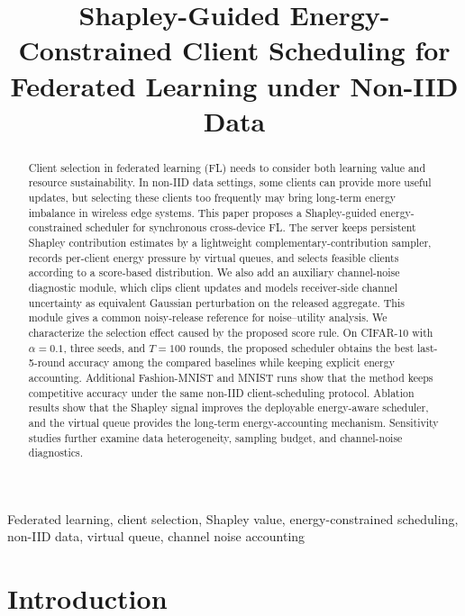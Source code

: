 \documentclass[journal]{IEEEtran}
\newcommand{\PaperTitle}{Shapley-Guided Energy-Constrained Client Scheduling for Federated Learning under Non-IID Data}
\begin{document}
\title{\PaperTitle}

\author{}

\maketitle

\begin{abstract}
Client selection in federated learning (FL) needs to consider both learning value and resource sustainability. In non-IID data settings, some clients can provide more useful updates, but selecting these clients too frequently may bring long-term energy imbalance in wireless edge systems. This paper proposes a Shapley-guided energy-constrained scheduler for synchronous cross-device FL. The server keeps persistent Shapley contribution estimates by a lightweight complementary-contribution sampler, records per-client energy pressure by virtual queues, and selects feasible clients according to a score-based distribution. We also add an auxiliary channel-noise diagnostic module, which clips client updates and models receiver-side channel uncertainty as equivalent Gaussian perturbation on the released aggregate. This module gives a common noisy-release reference for noise--utility analysis. We characterize the selection effect caused by the proposed score rule. On CIFAR-10 with $\alpha=0.1$, three seeds, and $T=100$ rounds, the proposed scheduler obtains the best last-5-round accuracy among the compared baselines while keeping explicit energy accounting. Additional Fashion-MNIST and MNIST runs show that the method keeps competitive accuracy under the same non-IID client-scheduling protocol. Ablation results show that the Shapley signal improves the deployable energy-aware scheduler, and the virtual queue provides the long-term energy-accounting mechanism. Sensitivity studies further examine data heterogeneity, sampling budget, and channel-noise diagnostics.
\end{abstract}

\begin{IEEEkeywords}
Federated learning, client selection, Shapley value, energy-constrained scheduling, non-IID data, virtual queue, channel noise accounting
\end{IEEEkeywords}

\section{Introduction}
\end{document}

